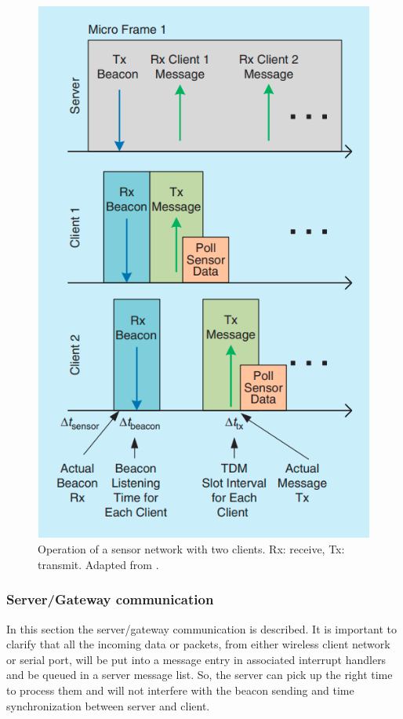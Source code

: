 \documentclass[journal]{IEEEtran}	%
\begin{document}
\begin{figure}[t!]
\centering
\includegraphics[width=0.8\columnwidth]{fig9.png}
\caption{Operation of a sensor network with two clients. Rx: receive, Tx: transmit. Adapted from \cite{williams2017weaving}.}
\label{fig:beacons}
\end{figure}


\subsubsection{Server/Gateway communication}


In this section the server/gateway communication is described. It is important to clarify that all the incoming data or packets, from either wireless client network or serial port, will be put into a message entry in associated interrupt handlers and be queued in a server message list. So, the server can pick up the right time to process them and will not interfere with the beacon sending and time synchronization between server and client.
\end{document}
